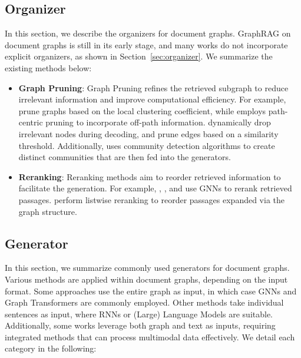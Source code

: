 \subsection{Organizer}

In this section, we describe the organizers for document graphs. GraphRAG on document graphs is still in its early stage, and many works do not incorporate explicit organizers, as shown in Section~\ref{sec:organizer}. We summarize the existing methods below:

\begin{itemize}[leftmargin=*]
    \item \textbf{Graph Pruning}: Graph Pruning refines the retrieved subgraph to reduce irrelevant information and improve computational efficiency. For example, \citet{hemmati2023multi} prune graphs based on the local clustering coefficient, while \citet{zhang2018graph1} employs path-centric pruning to incorporate off-path information. \citet{li2022graph} dynamically drop irrelevant nodes during decoding, and \citet{angelova2006graph} prune edges based on a similarity threshold. Additionally, \citet{edge2024local} uses community detection algorithms to create distinct communities that are then fed into the generators.
    \item \textbf{Reranking}:  Reranking methods aim to reorder retrieved information to facilitate the generation. For example, \citet{yu2021kg}, \citet{zhang2021answering}, and \citet{dong2024don} use GNNs to rerank retrieved passages. \citet{li2021graph} perform listwise reranking to reorder passages expanded via the graph structure.
\end{itemize}

\subsection{Generator}
In this section, we summarize commonly used generators for document graphs. Various methods are applied within document graphs, depending on the input format. Some approaches use the entire graph as input, in which case GNNs and Graph Transformers are commonly employed. Other methods take individual sentences as input, where RNNs or (Large) Language Models are suitable. Additionally, some works leverage both graph and text as inputs, requiring integrated methods that can process multimodal data effectively. We detail each category in the following:


